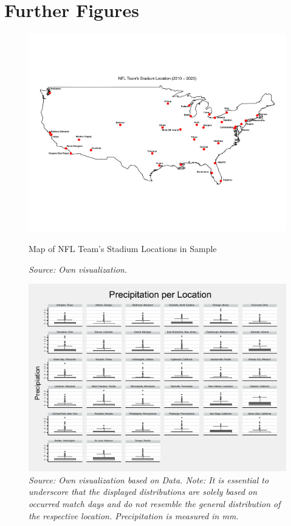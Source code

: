 \documentclass[12pt,a4paper]{article}
\begin{document}
{\section{Further Figures}
\begin{figure}[h]
	\center
	\includegraphics[scale=0.59, angle = 90]{../05_Figures/Teams_Location.pdf}
	\caption{Map of NFL Team's Stadium Locations in Sample}
	\caption*{\footnotesize \textit{Source: Own visualization.}}
	\label{AppF:1}
\end{figure}
\clearpage
\vfill
\begin{figure}
	\center
	\includegraphics[scale=1.7]{../05_Figures/Percipitation_per_Place.pdf}
	\caption*{\footnotesize \textit{Source: Own visualization based on \citeauthor{PRISM} Data. Note: It is essential to underscore that the displayed distributions are solely based on occurred match days and do not resemble the general distribution of the respective location. Precipitation is measured in mm.}}

\end{figure}}
\end{document}
